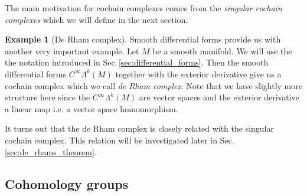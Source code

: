 \documentclass[12pt,a4paper]{article}
\numberwithin{equation}{subsection}
\numberwithin{lemma}{subsection}
\theoremstyle{definition}
\newtheorem{example}[lemma]{Example}
\begin{document}
The main motivation for cochain complexes comes from the 
\textit{singular cochain complexes} which we will define in the next 
section.

\begin{example}[De Rham complex]
    Smooth differential forms provide us with another very important example. 
    Let $M$ be a smooth manifold.
    We will use the the notation introduced in 
    Sec.\,\ref{sec:differential_forms}. Then the smooth 
    differential forms $C^\infty \Lambda^k (M)$ together 
    with the exterior derivative give us a cochain complex which we call 
    \textit{de Rham complex}. Note that we have slightly more structure here
    since the $C^\infty \Lambda^k (M)$ are vector spaces and the exterior
    derivative a linear map i.e. a vector space homomorphism.
\end{example}
It turns out that the de Rham complex is closely related with the 
singular cochain complex. This relation will be investigated later in 
Sec.\,\ref{sec:de_rhams_theorem}. %

\subsection{Cohomology groups}
\end{document}

